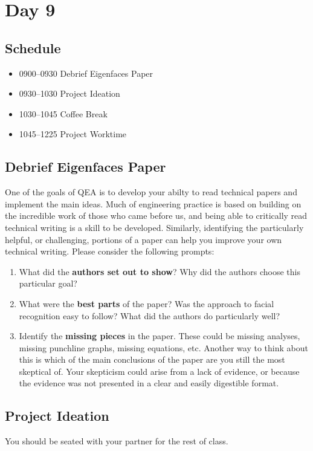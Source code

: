 \chapter{Day 9}

\section*{Schedule}
\begin{itemize}
\item 0900--0930		Debrief Eigenfaces Paper
\item 0930--1030        Project Ideation
\item 1030--1045		Coffee Break
\item 1045--1225        Project Worktime
\end{itemize}

\section{Debrief Eigenfaces Paper}

One of the goals of QEA is to develop your abilty to read technical papers and implement the main ideas. Much of engineering practice is based on building on the incredible work of those who came before us, and being able to critically read technical writing is a skill to be developed. Similarly, identifying the particularly helpful, or challenging, portions of a paper can help you improve your own technical writing. Please consider the following prompts:
\begin{prob}
\begin{enumerate}
\item What did the \textbf{authors set out to show}?  Why did the authors choose this particular goal?
\item What were the \textbf{best parts} of the paper? Was the approach to facial recognition easy to follow? What did the authors do particularly well?
\item Identify the \textbf{missing pieces} in the paper.  These could be missing analyses, missing punchline graphs, missing equations, etc. Another way to think about this is which of the main conclusions of the paper are you still the most skeptical of.  Your skepticism could arise from a lack of evidence, or because the evidence was not presented in a clear and easily digestible format.
\end{enumerate}
\end{prob}

\section{Project Ideation}
You should be seated with your partner for the rest of class.

